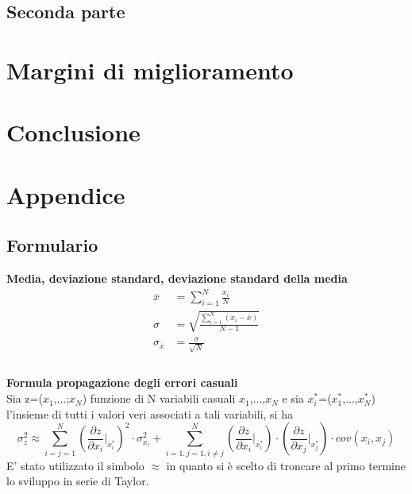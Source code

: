 \documentclass[a4paper,11pt,oneside]{article}
\begin{document}
\subsection{Seconda parte}


\section{Margini di miglioramento}
\section{Conclusione}
\newpage
\section{Appendice}

\subsection{Formulario}
\textbf{Media, deviazione standard, deviazione standard della media}
\begin{equation*}
    \begin{aligned}
        \overline{x}&=\sum\limits_{i=1}^{N} \frac{x_{i}}{N}\\
        \sigma&=\sqrt{\frac{\sum\limits_{i=1}^{N} (x_{i}-\overline{x})}{N-1}}\\
        \sigma_{\overline{x}}&=\frac{\sigma}{\sqrt{N}}\\
    \end{aligned}
\end{equation*}\\

\textbf{Formula propagazione degli errori casuali}\\

Sia z=($x_1$,...;$x_N$) funzione di N variabili casuali $x_1$,...,$x_N$ e sia ${x_i^\ast}$=($x_1^\ast$,...,$x_N^{\ast}$) l'insieme di tutti i valori veri associati a tali variabili, si ha 
\begin{equation*}\label{eq:teorema_varianze}
    \sigma_z^{2}\approx  \sum_{i=j=1}^{N}\left ( \frac{\partial z}{\partial x_i}\Big|_{x_i^{\ast}} \right )^{2}\cdot\sigma_{x_i}^{2} +\sum_{i=1,j=1,i\neq j}^{N}\left (\frac{\partial z }{\partial x_i}\Big|_{x_i^{\ast}} \right ) \cdot \left ( \frac{\partial z}{\partial x_j} \Big|_{x_j^{\ast}} \right )\cdot cov(x_i,x_j)
\end{equation*}
E' stato utilizzato il simbolo $\approx$ in quanto si è scelto di troncare al primo termine lo sviluppo in serie di Taylor.
\end{document}
